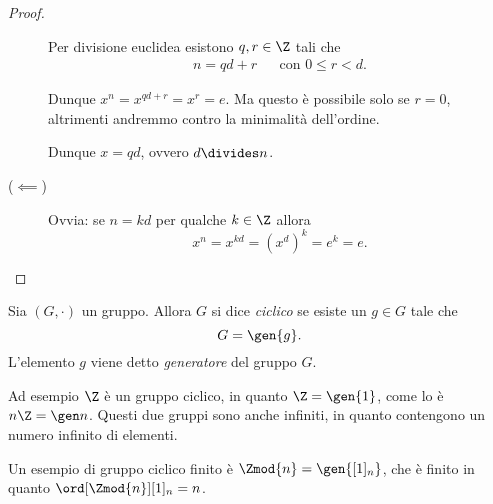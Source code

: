 \begin{proof}
\begin{description}
        Per divisione euclidea esistono $q, r \in \Z$ tali che \begin{align*}
            n = qd + r &&\text{con } 0 \leq r < d.
        \end{align*}

        Dunque $x^n = x^{qd+r} = x^r = e$. Ma questo è possibile solo se $r = 0$, altrimenti andremmo contro la minimalità dell'ordine.
        
        Dunque $x = qd$, ovvero $d \divides n$.
        \item[($\impliedby$)] Ovvia: se $n = kd$ per qualche $k \in \Z$ allora \[
            x^n = x^{kd} = (x^d)^k = e^k = e.    
        \]
    \end{description}
\end{proof}

\begin{definition}
    \label{def:grp_ciclico}
    Sia $(G, \cdot)$ un gruppo. 
    Allora $G$ si dice \emph{ciclico} se esiste un $g \in G$ tale che \[
        G = \gen{g}.    
    \]
    L'elemento $g$ viene detto \emph{generatore} del gruppo $G$.
\end{definition}

Ad esempio $\Z$ è un gruppo ciclico, in quanto $\Z = \gen{1}$, come lo è $n\Z = \gen n$. Questi due gruppi sono anche infiniti, in quanto contengono un numero infinito di elementi.

Un esempio di gruppo ciclico finito è $\Zmod{n} = \gen{[1]_n}$, che è finito in quanto $\ord[\Zmod{n}]{[1]_n} = n$.

